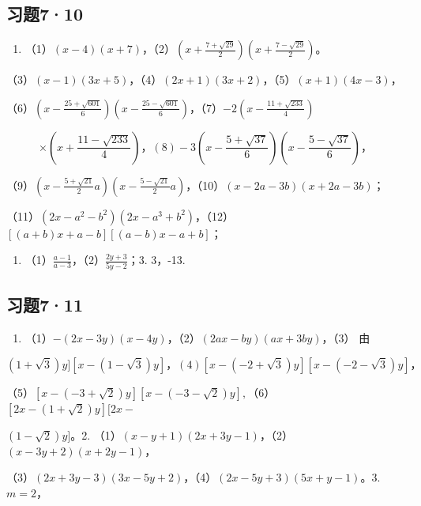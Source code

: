 \subsection{习题7·10}

\begin{enumerate}
\item
  （1）\((x - 4)(x + 7)\)，（2）\(\left(x + \frac{7 + \sqrt{29}}{2}\right)\left(x + \frac{7 - \sqrt{29}}{2}\right)\)。
\end{enumerate}

（3）\((x - 1)(3x + 5)\)，（4）\((2x + 1)(3x + 2)\)，（5）\((x + 1)(4x - 3)\)，

（6）\(\left(x - \frac{25 + \sqrt{601}}{6}\right)\left(x - \frac{25 - \sqrt{601}}{6}\right)\)，（7）\(-2\left(x - \frac{11 + \sqrt{233}}{4}\right)\)

\[
\times \left(x + \frac{11 - \sqrt {233}}{4}\right)\text{，} (8) - 3 \left(x - \frac{5 + \sqrt {37}}{6}\right) \left(x - \frac{5 - \sqrt {37}}{6}\right)\text{，}
\]

（9）\(\left(x - \frac{5 + \sqrt{21}}{2} a\right)\left(x - \frac{5 - \sqrt{21}}{2} a\right)\)，（10）\((x - 2a - 3b)(x + 2a - 3b)\)；

（11）\((2x - a^2 - b^2)(2x - a^3 + b^2)\)，（12）\([(a + b)x + a - b][(a - b)x - a + b]\)；

\begin{enumerate}[start=2]
\item
  （1）\(\frac{a - 1}{a - 3}\)，（2）\(\frac{2y + 3}{5y - 2}\)；3.
  3，-13.
\end{enumerate}

\subsection{习题7·11}

\begin{enumerate}
\item
  （1）\(-(2x - 3y)(x - 4y)\)，（2）\((2ax - by)(ax + 3by)\)，（3） 由
\end{enumerate}

\[
(1 + \sqrt {3}) y ] [ x - (1 - \sqrt {3}) y ]\text{，} (4) [ x - (- 2 + \sqrt {3}) y ] [ x - (- 2 - \sqrt {3}) y ]\text{，}
\]

（5）\([x - (-3 + \sqrt{2})y][x - (-3 - \sqrt{2})y],\)（6）\([2x - (1 + \sqrt{2})y][2x -\)

\((1 - \sqrt{2})y]\)。2.
（1）\((x - y + 1)(2x + 3y - 1)\)，（2）\((x - 3y + 2)(x + 2y - 1)\)，

（3）\((2x + 3y - 3)(3x - 5y + 2)\)，（4）\((2x - 5y + 3)(5x + y - 1)\)。3.\(m = 2\)，

